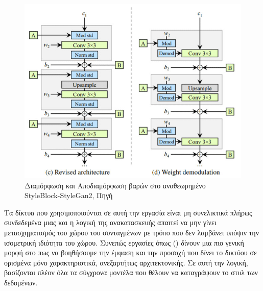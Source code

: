     \begin{figure}[H]
        \centering
        \includegraphics[width = 0.5\linewidth]{images/chapter3_img/styleblock.jpg}
        \caption{Διαμόρφωση και Αποδιαμόρφωση βαρών  στο αναθεωρημένο StyleBlock-StyleGan2, Πηγή \cite{karras2020analyzing}}
        \label{fig:styleblock2}
    \end{figure}

\par
    Τα δίκτυα που χρησιμοποιούνται σε αυτή την εργασία είναι μη συνελικτικά πλήρως συνδεδεμένα  μιας και η λογική της ανακατασκευής απαιτεί να μην γίνει μετασχηματισμός του χώρου του συνταγμένων με τρόπο που δεν λαμβάνει υπόψιν την ισομετρική ιδιότητα του χώρου.  Συνεπώς εργασίες όπως \cite{vaswani2023attention} () δίνουν μια πιο γενική μορφή στο πως να βοηθήσουμε την έμφαση και την προσοχή που δίνει το δικτύου σε ορισμένα μόνο χαρακτηριστικά, ανεξαρτήτως αρχιτεκτονικής. Σε αυτή την λογική, βασίζονται πλέον όλα τα σύγχρονα μοντέλα που θέλουν να καταγράψουν το στυλ των δεδομένων. 